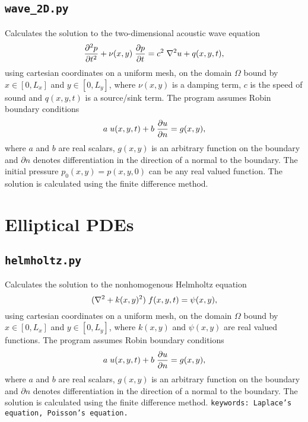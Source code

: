 \documentclass{article}
\begin{document}
\subsection{\texttt{wave\_2D.py}} 
Calculates the solution to the two-dimensional acoustic wave equation
\begin{equation*}
\frac{\partial^2 p}{\partial t^2} + \nu(x,y) \hspace{0.1cm} \frac{\partial p}{\partial t} = c^2 \hspace{0.1cm} \nabla^{2} u + q(x,y,t),
\end{equation*}
using cartesian coordinates on a uniform mesh, on the domain $\Omega$ bound by $x \in [0,L_x]$ and $y \in [0,L_y]$, where $\nu(x,y)$ is a damping term, $c$ is the speed of sound and $q(x,y,t)$ is a source/sink term. The program assumes Robin boundary conditions
\begin{equation*}
a \hspace{0.1cm} u(x,y,t) + b \hspace{0.1cm} \frac{\partial u}{\partial n} = g(x,y),
\end{equation*}
where $a$ and $b$ are real scalars, $g(x,y)$ is an arbitrary function on the boundary and $\partial n$ denotes differentiation in the direction of a normal to the boundary. The initial pressure $p_0(x,y)=p(x,y,0)$ can be any real valued function. The solution is calculated using the finite difference method.

\section{Elliptical PDEs}
\subsection{\texttt{helmholtz.py}} 
Calculates the solution to the nonhomogenous Helmholtz equation
\begin{equation*}
(\nabla^2 + k(x,y)^2) \hspace{0.1cm} f(x,y,t) = \psi(x,y),
\end{equation*}
using cartesian coordinates on a uniform mesh, on the domain $\Omega$ bound by \newline $x \in [0,L_x]$ and $y \in [0,L_y]$, where $k(x,y)$ and $\psi(x,y)$ are real valued functions. The program assumes Robin boundary conditions
\begin{equation*}
a \hspace{0.1cm} u(x,y,t) + b \hspace{0.1cm} \frac{\partial u}{\partial n} = g(x,y),
\end{equation*}
where $a$ and $b$ are real scalars, $g(x,y)$ is an arbitrary function on the boundary and $\partial n$ denotes differentiation in the direction of a normal to the boundary. The solution is calculated using the finite difference method. \newline
\newline
\texttt{keywords: Laplace's equation, Poisson's equation.}
\end{document}
